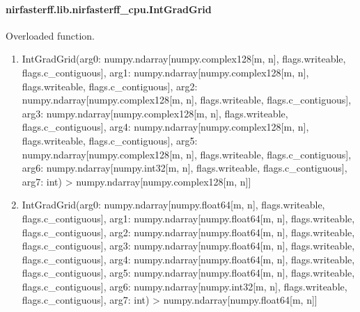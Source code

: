 \documentclass[letterpaper,10pt,english]{sphinxmanual}
\begin{document}
\sphinxstepscope


\paragraph{nirfasterff.lib.nirfasterff\_cpu.IntGradGrid}
\label{\detokenize{_autosummary/nirfasterff.lib.nirfasterff_cpu.IntGradGrid:nirfasterff-lib-nirfasterff-cpu-intgradgrid}}\label{\detokenize{_autosummary/nirfasterff.lib.nirfasterff_cpu.IntGradGrid::doc}}

\begin{fulllineitems}
\label{\detokenize{_autosummary/nirfasterff.lib.nirfasterff_cpu.IntGradGrid:nirfasterff.lib.nirfasterff_cpu.IntGradGrid}}
\pysigstartsignatures
\pysiglinewithargsret
{}
{\sphinxparamcomma {}}
{}
\pysigstopsignatures
\sphinxAtStartPar
Overloaded function.
\begin{enumerate}
%
\item {} 
\sphinxAtStartPar
IntGradGrid(arg0: numpy.ndarray{[}numpy.complex128{[}m, n{]}, flags.writeable, flags.c\_contiguous{]}, arg1: numpy.ndarray{[}numpy.complex128{[}m, n{]}, flags.writeable, flags.c\_contiguous{]}, arg2: numpy.ndarray{[}numpy.complex128{[}m, n{]}, flags.writeable, flags.c\_contiguous{]}, arg3: numpy.ndarray{[}numpy.complex128{[}m, n{]}, flags.writeable, flags.c\_contiguous{]}, arg4: numpy.ndarray{[}numpy.complex128{[}m, n{]}, flags.writeable, flags.c\_contiguous{]}, arg5: numpy.ndarray{[}numpy.complex128{[}m, n{]}, flags.writeable, flags.c\_contiguous{]}, arg6: numpy.ndarray{[}numpy.int32{[}m, n{]}, flags.writeable, flags.c\_contiguous{]}, arg7: int) \sphinxhyphen{}\textgreater{} numpy.ndarray{[}numpy.complex128{[}m, n{]}{]}

\item {} 
\sphinxAtStartPar
IntGradGrid(arg0: numpy.ndarray{[}numpy.float64{[}m, n{]}, flags.writeable, flags.c\_contiguous{]}, arg1: numpy.ndarray{[}numpy.float64{[}m, n{]}, flags.writeable, flags.c\_contiguous{]}, arg2: numpy.ndarray{[}numpy.float64{[}m, n{]}, flags.writeable, flags.c\_contiguous{]}, arg3: numpy.ndarray{[}numpy.float64{[}m, n{]}, flags.writeable, flags.c\_contiguous{]}, arg4: numpy.ndarray{[}numpy.float64{[}m, n{]}, flags.writeable, flags.c\_contiguous{]}, arg5: numpy.ndarray{[}numpy.float64{[}m, n{]}, flags.writeable, flags.c\_contiguous{]}, arg6: numpy.ndarray{[}numpy.int32{[}m, n{]}, flags.writeable, flags.c\_contiguous{]}, arg7: int) \sphinxhyphen{}\textgreater{} numpy.ndarray{[}numpy.float64{[}m, n{]}{]}

\end{enumerate}

\end{fulllineitems}
\end{document}
